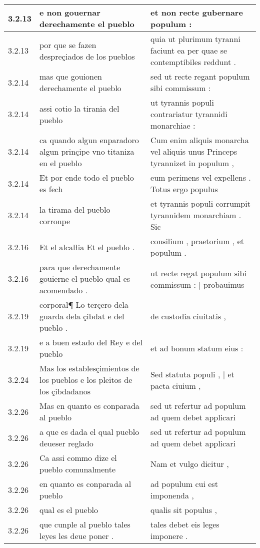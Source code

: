 \begin{tabular}{|p{1cm}|p{6.5cm}|p{6.5cm}|}
3.2.13 & e non gouernar derechamente el pueblo & et non recte gubernare populum : \\\hline
3.2.13 & por que se fazen despreçiados de los pueblos & quia ut plurimum tyranni faciunt ea per quae se contemptibiles reddunt . \\\hline
3.2.14 & mas que gouionen derechamente el pueblo & sed ut recte regant populum sibi commissum : \\\hline
3.2.14 & assi cotio la tirania del pueblo & ut tyrannis populi contrariatur tyrannidi monarchiae : \\\hline
3.2.14 & ca quando algun enparadoro algun prinçipe vno titaniza en el pueblo & Cum enim aliquis monarcha vel aliquis unus Princeps tyrannizet in populum , \\\hline
3.2.14 & Et por ende todo el pueblo es fech & eum perimens vel expellens . Totus ergo populus \\\hline
3.2.14 & la tirama del pueblo corronpe & et tyrannis populi corrumpit tyrannidem monarchiam . Sic \\\hline
3.2.16 & Et el alcalłia Et el pueblo . & consilium , praetorium , et populum . \\\hline
3.2.16 & para que derechamente gouierne el pueblo qual es acomendado . & ut recte regat populum sibi commissum : | probauimus \\\hline
3.2.19 & corporal¶ Lo terçero dela guarda dela çibdat e del pueblo . & de custodia ciuitatis , \\\hline
3.2.19 & e a buen estado del Rey e del pueblo & et ad bonum statum eius : \\\hline
3.2.24 & Mas los establesçimientos de los pueblos e los pleitos de los çibdadanos & Sed statuta populi , | et pacta ciuium , \\\hline
3.2.26 & Mas en quanto es conparada al pueblo & sed ut refertur ad populum ad quem debet applicari \\\hline
3.2.26 & a que es dada el qual pueblo deueser reglado & sed ut refertur ad populum ad quem debet applicari \\\hline
3.2.26 & Ca assi commo dize el pueblo comunalmente & Nam et vulgo dicitur , \\\hline
3.2.26 & en quanto es conparada al pueblo & ad populum cui est imponenda , \\\hline
3.2.26 & qual es el pueblo & qualis sit populus , \\\hline
3.2.26 & que cunple al pueblo tales leyes les deue poner . & tales debet eis leges imponere . \\\hline

\end{tabular}
